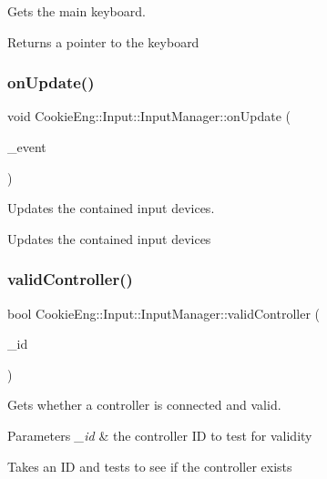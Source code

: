 Gets the main keyboard. 

Returns a pointer to the keyboard \mbox{\label{class_cookie_eng_1_1_input_1_1_input_manager_ab76d5635bce758f681129ea0cd4afb36}} 
\subsubsection{\texorpdfstring{on\+Update()}{onUpdate()}}
{\footnotesize\ttfamily void Cookie\+Eng\+::\+Input\+::\+Input\+Manager\+::on\+Update (\begin{DoxyParamCaption}\item[{S\+D\+L\+\_\+\+Event \&}]{\+\_\+event }\end{DoxyParamCaption})}



Updates the contained input devices. 

Updates the contained input devices \mbox{\label{class_cookie_eng_1_1_input_1_1_input_manager_aec78aafcc64f05a3e4eb094e7bb690a6}} 
\subsubsection{\texorpdfstring{valid\+Controller()}{validController()}}
{\footnotesize\ttfamily bool Cookie\+Eng\+::\+Input\+::\+Input\+Manager\+::valid\+Controller (\begin{DoxyParamCaption}\item[{int}]{\+\_\+id }\end{DoxyParamCaption})\hspace{0.3cm}{\ttfamily [inline]}}



Gets whether a controller is connected and valid. 


\begin{DoxyParams}{Parameters}
{\em \+\_\+id} & the controller ID to test for validity\\
\hline
\end{DoxyParams}
Takes an ID and tests to see if the controller exists 

